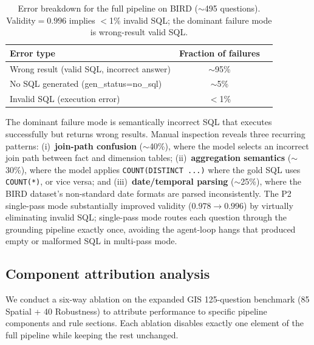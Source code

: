 \documentclass[11pt]{article}
\begin{document}
\begin{table}[t]
\centering
\caption{Error breakdown for the full pipeline on BIRD ($\sim$495 questions). Validity$=0.996$ implies $<$1\% invalid SQL; the dominant failure mode is wrong-result valid SQL.}
\label{tab:errors}
\begin{tabular}{lcc}
\toprule
Error type & Fraction of failures \\
\midrule
Wrong result (valid SQL, incorrect answer) & $\sim$95\% \\
No SQL generated (gen\_status=no\_sql)      & $\sim$5\% \\
Invalid SQL (execution error)               & $<$1\% \\
\bottomrule
\end{tabular}
\end{table}

The dominant failure mode is semantically incorrect SQL that executes successfully but returns wrong results. Manual inspection reveals three recurring patterns: (i)~\textbf{join-path confusion} ($\sim$40\%), where the model selects an incorrect join path between fact and dimension tables; (ii)~\textbf{aggregation semantics} ($\sim$30\%), where the model applies \texttt{COUNT(DISTINCT ...)} where the gold SQL uses \texttt{COUNT(*)}, or vice versa; and (iii)~\textbf{date/temporal parsing} ($\sim$25\%), where the BIRD dataset's non-standard date formats are parsed inconsistently. The P2 single-pass mode substantially improved validity ($0.978\to0.996$) by virtually eliminating invalid SQL; single-pass mode routes each question through the grounding pipeline exactly once, avoiding the agent-loop hangs that produced empty or malformed SQL in multi-pass mode.

\subsection{Component attribution analysis}
\label{sec:ablation}

We conduct a six-way ablation on the expanded GIS 125-question benchmark (85 Spatial + 40 Robustness) to attribute performance to specific pipeline components and rule sections. Each ablation disables exactly one element of the full pipeline while keeping the rest unchanged.
\end{document}
